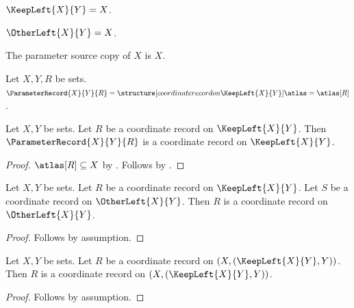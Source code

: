 

\begin{abbreviation}\label{parameter_keep_left}
    $\KeepLeft{X}{Y}=X$.
\end{abbreviation}

\begin{abbreviation}\label{parameter_other_left}
    $\OtherLeft{X}{Y}=X$.
\end{abbreviation}

\begin{definition}\label{parameter_source_copy}
    The parameter source copy of $X$ is $X$.
\end{definition}

\begin{definition}\label{parameter_record_provider}
    Let $X,Y,R$ be sets.
    $\ParameterRecord{X}{Y}{R}=\structure[coordinate record on \KeepLeft{X}{Y}]{\atlas=\atlas[R]}$.
\end{definition}

\begin{classification}\label{parameter_provider_result}
    Let $X,Y$ be sets.
    Let $R$ be a coordinate record on $\KeepLeft{X}{Y}$.
    Then $\ParameterRecord{X}{Y}{R}$ is a coordinate record on $\KeepLeft{X}{Y}$.
\end{classification}
\begin{proof}
    $\atlas[R]\subseteq X$ by .
    Follows by .
\end{proof}

\begin{classification}\label{parameter_finite_rule}
    Let $X,Y$ be sets.
    Let $R$ be a coordinate record on $\KeepLeft{X}{Y}$.
    Let $S$ be a coordinate record on $\OtherLeft{X}{Y}$.
    Then $R$ is a coordinate record on $\OtherLeft{X}{Y}$.
\end{classification}
\begin{proof}
    Follows by assumption.
\end{proof}

\begin{proposition}\label{parameter_nested_source}
    Let $X,Y$ be sets.
    Let $R$ be a coordinate record on $(X,(\KeepLeft{X}{Y},Y))$.
    Then $R$ is a coordinate record on $(X,(\KeepLeft{X}{Y},Y))$.
\end{proposition}
\begin{proof}
    Follows by assumption.
\end{proof}

